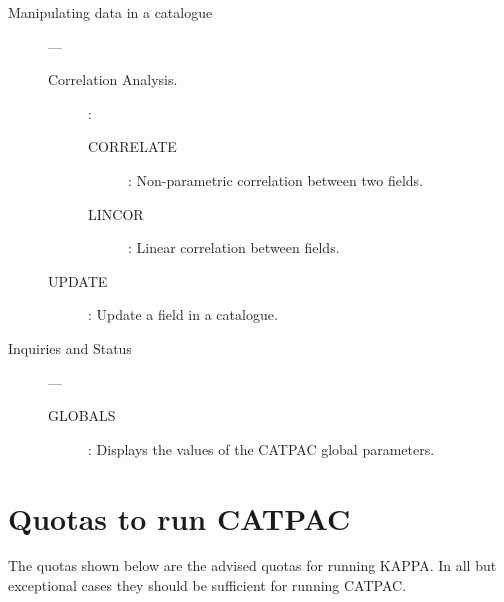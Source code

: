 \begin{description}
\begin{description}
\end{description}

\item [Manipulating data in a catalogue] ---

\begin{description}

\item [Correlation Analysis.]:

\begin{description}

\item [CORRELATE]:
 Non-parametric correlation between two fields.

\item [LINCOR]:
 Linear correlation between fields.

\end{description}

\item [UPDATE]:
 Update a field in a catalogue.

\end{description}

\item [Inquiries and Status] ---

\begin{description}

\begin{description}

\item [GLOBALS]:
 Displays the values of the CATPAC global parameters.

\end{description}

\end{description}

\end{description}

\section{Quotas to run CATPAC}
\label{ap:quotas}

The quotas shown below are the advised quotas for running {\small KAPPA}. In
all but exceptional cases they should be sufficient for running {\small
CATPAC}.

